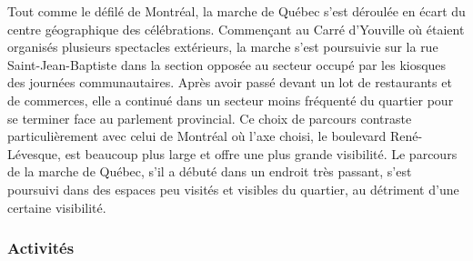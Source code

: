 Tout comme le défilé de Montréal, la marche de Québec s'est déroulée en écart du centre géographique des célébrations.
Commençant au Carré d'Youville où étaient organisés plusieurs spectacles extérieurs, la marche s'est poursuivie sur la rue Saint-Jean-Baptiste dans la section opposée au secteur occupé par les kiosques des journées communautaires.
Après avoir passé devant un lot de restaurants et de commerces, elle a continué dans un secteur moins fréquenté du quartier pour se terminer face au parlement provincial.
Ce choix de parcours contraste particulièrement avec celui de Montréal où l'axe choisi, le boulevard René-Lévesque, est beaucoup plus large et offre une plus grande visibilité.
Le parcours de la marche de Québec, s'il a débuté dans un endroit très passant, s'est poursuivi dans des espaces peu visités et visibles du quartier, au détriment d'une certaine visibilité.

\subsubsection{Activités}
\label{subsec:activitesfiertemontreal}




